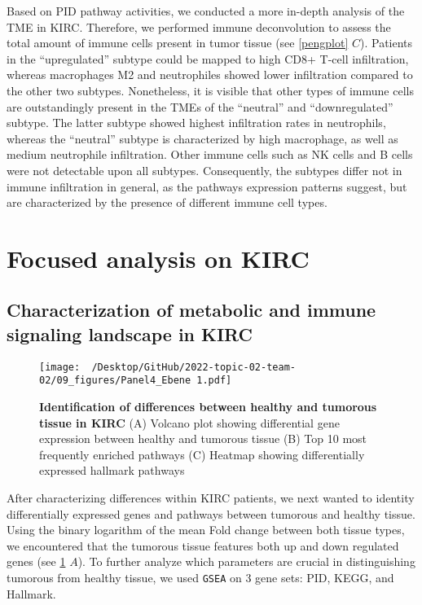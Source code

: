 \documentclass[
  parskip,
  oneside]{scrreprt}
\begin{document}
Based on PID pathway activities, we conducted a more in-depth analysis
of the TME in KIRC. Therefore, we performed immune deconvolution to
assess the total amount of immune cells present in tumor tissue (see
\cref{pengplot} \(C\)). Patients in the ``upregulated'' subtype could be
mapped to high CD8+ T-cell infiltration, whereas macrophages M2 and
neutrophiles showed lower infiltration compared to the other two
subtypes. Nonetheless, it is visible that other types of immune cells
are outstandingly present in the TMEs of the ``neutral'' and
``downregulated'' subtype. The latter subtype showed highest
infiltration rates in neutrophils, whereas the ``neutral'' subtype is
characterized by high macrophage, as well as medium neutrophile
infiltration. Other immune cells such as NK cells and B cells were not
detectable upon all subtypes. Consequently, the subtypes differ not in
immune infiltration in general, as the pathways expression patterns
suggest, but are characterized by the presence of different immune cell
types.

\hypertarget{focused-analysis-on-kirc}{%
\section{Focused analysis on KIRC}\label{focused-analysis-on-kirc}}

\hypertarget{characterization-of-metabolic-and-immune-signaling-landscape-in-kirc}{%
\subsection{Characterization of metabolic and immune signaling landscape
in
KIRC}\label{characterization-of-metabolic-and-immune-signaling-landscape-in-kirc}}

\begin{figure}[h]
  \texttt{[image: ~/Desktop/GitHub/2022-topic-02-team-02/09\_figures/Panel4\_Ebene 1.pdf]}
  \caption{\textbf{Identification of differences between healthy and tumorous tissue in KIRC }(A) Volcano plot showing differential gene expression between healthy and tumorous tissue (B) Top 10 most frequently enriched pathways (C) Heatmap showing differentially expressed hallmark pathways}
  \label{volcano}
\end{figure}

After characterizing differences within KIRC patients, we next wanted to
identity differentially expressed genes and pathways between tumorous
and healthy tissue. Using the binary logarithm of the mean Fold change
between both tissue types, we encountered that the tumorous tissue
features both up and down regulated genes (see \cref{volcano} \(A\)). To
further analyze which parameters are crucial in distinguishing tumorous
from healthy tissue, we used \texttt{GSEA} on 3 gene sets: PID, KEGG,
and Hallmark.
\end{document}
